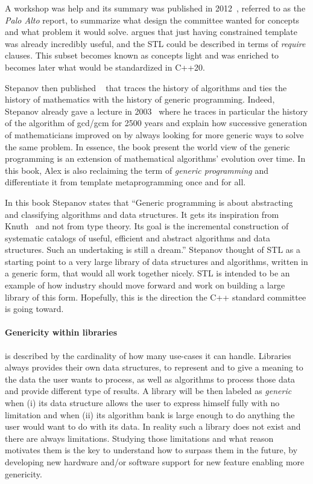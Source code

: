 A workshop was help and its summary was published in 2012~\parencite{sutton.2012.concepts}, referred to as the \emph{Palo
  Alto} report, to summarize what design the committee wanted for concepts and what problem it would solve.
 argues that just having constrained template was already incredibly useful, and the
STL could be described in terms of \emph{require} clauses. This subset becomes known as concepts light and was enriched
to becomes later what would be standardized in C++20.

Stepanov then published ~\parencite{stepanov.2014.mathematics} that traces the
history of algorithms and ties the history of mathematics with the history of generic programming. Indeed, Stepanov
already gave a lecture in 2003~\parencite{stepanov.2003.gcm} where he traces in particular the history of the algorithm
of gcd/gcm for 2500 years and explain how successive generation of mathematicians improved on by always looking for more
generic ways to solve the same problem. In essence, the book present the world view of the generic programming is an
extension of mathematical algorithms' evolution over time. In this book, Alex is also reclaiming the term of
\emph{generic programming} and differentiate it from template metaprogramming once and for all.

In this book Stepanov states that ``Generic programming is about abstracting and classifying algorithms and data
structures. It gets its inspiration from Knuth~\parencite{knuth.2014.art} and not from type theory. Its goal is the
incremental construction of systematic catalogs of useful, efficient and abstract algorithms and data structures. Such
an undertaking is still a dream.'' Stepanov thought of STL as a starting point to a very large library of data
structures and algorithms, written in a generic form, that would all work together nicely. STL is intended to be an
example of how industry should move forward and work on building a large library of this form. Hopefully, this is the
direction the C++ standard committee is going toward.

\paragraph{Genericity within libraries} is described by the cardinality of how many use-cases it can handle. Libraries
always provides their own data structures, to represent and to give a meaning to the data the user wants to process, as
well as algorithms to process those data and provide different type of results. A library will be then labeled as
\emph{generic}~\parencite{musser.1994.algorithm} when (i) its data structure allows the user
to express himself fully with no limitation and when (ii) its algorithm bank is large enough to do anything the user
would want to do with its data. In reality such a library does not exist and there are always limitations. Studying
those limitations and what reason motivates them is the key to understand how to surpass them in the future, by
developing new hardware and/or software support for new feature enabling more genericity.

